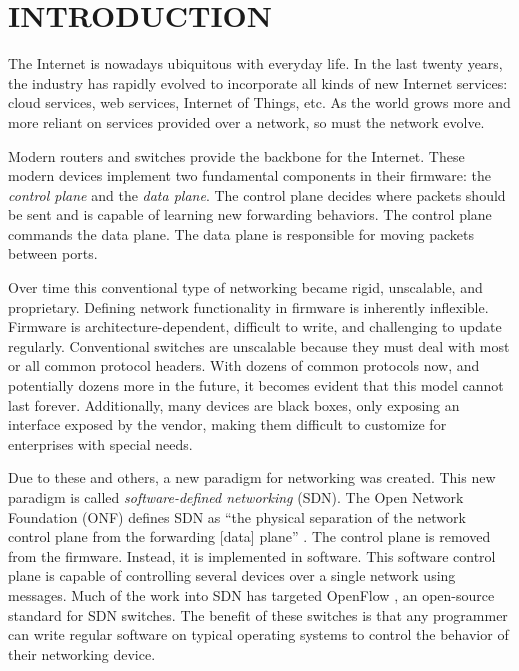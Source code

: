 \chapter{INTRODUCTION} \label{ch:intro}

%
%



The Internet is nowadays ubiquitous with everyday life. In the last twenty years,
the industry has rapidly evolved to incorporate all kinds of new Internet services:
cloud services, web services, Internet of Things, etc. As the world grows more and
more reliant on services provided over a network, so must the network evolve.

Modern routers and switches provide the backbone for the Internet.
These modern devices implement two fundamental components in their firmware: the
\emph{control plane} and the \emph{data plane}.
The control plane decides where packets should be sent and is capable of learning
new forwarding behaviors. The control plane commands the data plane.
The data plane is responsible for moving packets between ports.

Over time this conventional type of networking became rigid, unscalable, and
proprietary. Defining network functionality in firmware is inherently inflexible.
Firmware is architecture-dependent, difficult to write, and challenging to update
regularly.
Conventional switches are unscalable because they must deal with most or all
common protocol headers.
With dozens of common protocols now, and potentially dozens more in the future,
it becomes evident that this model cannot last forever.
Additionally, many devices are black boxes,
only exposing an interface exposed by the vendor,
making them difficult to customize for enterprises with special needs.

Due to these and others,
a new paradigm for networking was created. This new paradigm
is called \textit{software-defined networking} (SDN). The Open Network
Foundation (ONF) defines SDN as ``the physical separation of the network control
plane from the forwarding [data] plane'' \cite{onf_sdn_def}.
The control plane is removed from the firmware.
Instead, it is implemented in software.
This software control plane is capable of controlling several devices over a
single network using messages. Much of the work into SDN has targeted OpenFlow
\cite{openflow_spec}, an open-source standard for SDN switches. The benefit of
these switches is that any programmer can write regular software on typical operating
systems to control the behavior of their networking device.

